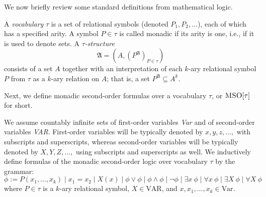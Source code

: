 \documentclass[a4paper,UKenglish,cleveref, autoref, thm-restate]{lipics-v2021}
\newcommand{\MSO}{\textsc{MSO}}
\begin{document}
We now brieﬂy review some standard deﬁnitions from mathematical logic.

\begin{samepage}
\begin{definition}
 A {\em vocabulary} $\tau$ is a set of relational symbols (denoted $P_1, P_2, \ldots $), each of which has a specified
 arity. A symbol $P \in \tau$ is called monadic if its arity is one, i.e., if it is used to
 denote sets.
%
A {\em $\tau$-structure} %
%
$$ \mathfrak{A} = (A,	( P^{\mathfrak{A}} )_{P \in \tau})$$
%
consists of a set $A$ together with an interpretation of
 each $k$-ary relational symbol $P$ from $\tau$ as a $k$-ary relation on $A$; that is, a
set $P^{\mathfrak{A}} \subseteq A^k$.
%
\end{definition}
\end{samepage}







Next, we deﬁne monadic second-order formulas over a vocabulary $\tau$, or $\MSO[\tau]$ for short. %

\begin{samepage}
\begin{definition}\label{MSO}
We assume countably infinite sets of first-order variables {\em Var}
and of second-order variables {\em VAR}. First-order variables
will be typically denoted by $x, y, z, \ldots,$ with subscripts and superscripts,
whereas second-order variables will be typically denoted by $X, Y, Z, \ldots ,$
using subscripts and superscripts as well. We
inductively define %
formulas of the monadic second-order logic
over vocabulary $\tau$ %
by the grammar:
$$ \phi :=  P(x_1 , \ldots , x_k) \mid x_1 = x_2 \mid X(x) 
		\mid \phi \vee \phi \mid \phi \wedge \phi \mid \neg \phi 
		\mid \exists x ~ \phi \mid  \forall x ~ \phi
		\mid \exists X ~ \phi \mid  \forall X ~ \phi		$$
where $P \in \tau$ is a $k$-ary relational symbol, $X \in \text{VAR}$, and $x, x_1, \ldots, x_k \in \text{Var}$.
\end{definition}
\end{samepage}
\end{document}
